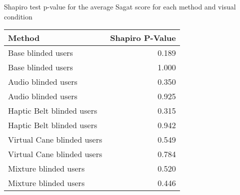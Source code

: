 
\centering
\caption{Shapiro test p-value for the average Sagat score for each method and visual condition}
\label{tab:shapiro_sagat_score_avg}
\begin{tabular}{lr}
\toprule
                    Method &  Shapiro P-Value \\
\midrule
        Base blinded users &            0.189 \\
        Base blinded users &            1.000 \\
       Audio blinded users &            0.350 \\
       Audio blinded users &            0.925 \\
 Haptic Belt blinded users &            0.315 \\
 Haptic Belt blinded users &            0.942 \\
Virtual Cane blinded users &            0.549 \\
Virtual Cane blinded users &            0.784 \\
     Mixture blinded users &            0.520 \\
     Mixture blinded users &            0.446 \\
\bottomrule
\end{tabular}
